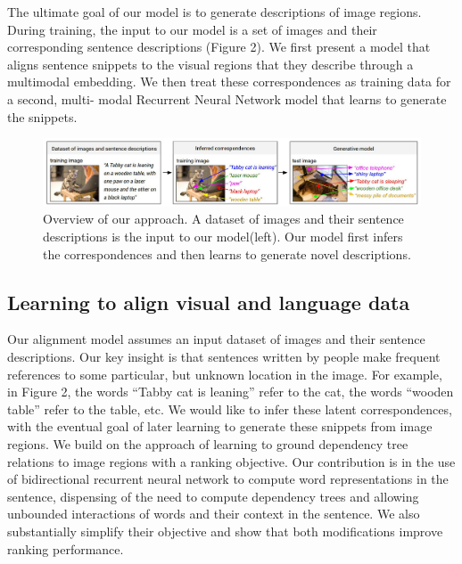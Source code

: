 \documentclass[12pt]{article}%
\begin{document}
The ultimate goal of our model is to generate descriptions of image regions. During training, the input  to our model is a set of images and their corresponding sentence descriptions (Figure 2). We first present a model that aligns sentence snippets to the visual regions that they describe through a multimodal embedding. We then treat these correspondences as training data for a second, multi- modal Recurrent Neural Network model that learns to generate the snippets.

\begin{figure}[t]
\begin{center}
   \includegraphics[width=0.8\linewidth]{p2.jpg}
\end{center}
   \caption{Overview of our approach. A dataset of images and their sentence descriptions is the input to our model(left). Our model first infers the correspondences and then learns to generate novel descriptions.}
\label{fig:circle}
\end{figure}

\subsection{Learning to align visual and language data}

Our alignment model assumes an input dataset of images and their sentence descriptions. Our key insight is that sentences written by people make frequent references to some particular, but unknown location in the image. For example, in Figure 2, the words ``Tabby cat is leaning'' refer to the cat, the words ``wooden table'' refer to the table, etc. We would like to infer these latent correspondences, with the eventual goal of later learning to generate these snippets from image regions. We build on the approach of learning to ground dependency tree relations to image regions with a ranking objective. Our contribution is in the use of bidirectional recurrent neural network to compute word representations in the sentence, dispensing of the need to compute dependency trees and allowing unbounded interactions of words and their context in the sentence. We also substantially simplify their objective and show that both modifications improve ranking performance.
\end{document}
